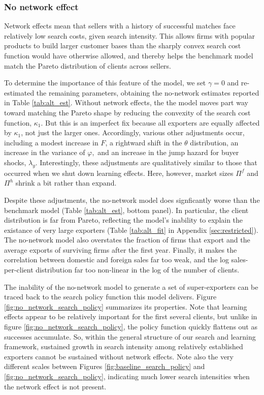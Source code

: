 \subsubsection{No network effect}

Network effects mean that sellers with a history of successful matches face
relatively low search costs, given search intensity. This allows firms with
popular products to build larger customer bases than the sharply convex
search cost function would have otherwise allowed, and thereby helps the
benchmark model match the Pareto distribution of clients across sellers.

To determine the importance of this feature of the model, we set $\gamma =0$
and re-estimated the remaining parameters, obtaining the no-network
estimates reported in Table \ref{tab:alt_est}. Without network effects, the the model moves part way toward matching the
Pareto shape by reducing the convexity of the search cost function, $\kappa
_{1}.$ But this is an imperfect fix because all exporters are equally
affected by $\kappa _{1}$, not just the larger ones. Accordingly, various
other adjustments occur, including a modest increase in $F$, a rightward
shift in the $\theta $ distribution, an increase in the variance of $\varphi
,$ and an increase in the jump hazard for buyer shocks, $\lambda _{y}.$
Interestingly, these adjustments are qualitatively similar to those that
occurred when we shut down learning effects. Here, however, market sizes $%
\Pi ^{f}$ and $\Pi ^{h}$ shrink a bit rather than expand.

Despite these adjustments, the no-network model does signficantly worse than
the benchmark model (Table \ref{tab:alt_est}, bottom panel). In particular,
the client distribution is far from Pareto, reflecting the model's inability
to explain the existance of very large exporters (Table \ref{tab:alt_fit} in
Appendix \ref{sec:restricted}). The no-network model also overstates the
fraction of firms that export and the average exports of surviving firms
after the first year. Finally, it makes the correlation between domestic and
foreign sales far too weak, and the log sales-per-client distribution far
too non-linear in the log of the number of clients.

The inability of the no-network model to generate a set of super-exporters
can be traced back to the search policy function this model delivers. Figure %
\ref{fig:no_network_search_policy} summarizes its properties. Note that
learning effects appear to be relatively important for the first several
clients, but unlike in figure \ref{fig:no_network_search_policy}, the policy
function quickly flattens out as successes accumulate. So, within the
general structure of our search and learning framework, sustained growth in
search intensity among relatively established exporters cannot be sustained
without network effects. Note also the very different scales between Figures %
\ref{fig:baseline_search_policy} and \ref{fig:no_network_search_policy},
indicating much lower search intensities when the network effect is not
present.

